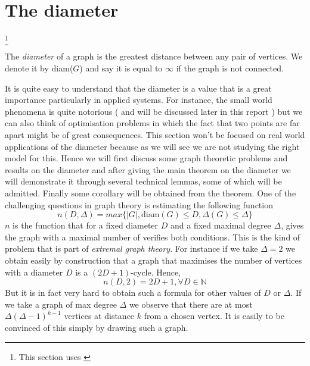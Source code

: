\section{The diameter}\footnote{This section uses \cite{Bollob01}}

\begin{definition}
	The \emph{diameter} of a graph is the greatest distance between any pair of vertices. We denote it by diam($G$) and say it is equal to $\infty$ if the graph is not connected.
\end{definition}
It is quite easy to understand that the diameter is a value that is a great importance particularly in applied systems. For instance, the small world phenomena is quite notorious ( and will be discussed later in this report ) but we can also think of optimisation problems in which the fact that two points are far apart might be of great consequences.
This section won't be focused on real world applications of the diameter because as we will see we are not studying the right model for this. 
Hence we will first discuss some graph theoretic problems and results on the diameter and after giving the main theorem on the diameter we will demonstrate it through several technical lemmas, some of which will be admitted. Finally some corollary will be obtained from the theorem.
\newline
One of the challenging questions in graph theory is estimating the following function
\begin{equation}
	n(D, \Delta) = max\{ |G|, \text{diam}(G) \leq D, \Delta(G) \leq \Delta\}
\end{equation}
$n$ is the function that for a fixed diameter $D$ and a fixed maximal degree $\Delta$, gives the graph with a maximal number of verifies both conditions. This is the kind of problem that is part of \emph{extremal graph theory}.
\newline
For instance if we take $\Delta = 2$ we obtain easily by construction that a graph that maximises the number of vertices with a diameter $D$ is a $(2D+1)$-cycle. Hence, 
\begin{equation}
	n(D, 2) = 2D + 1, \forall D \in \mathbb{N}
\end{equation}
But it is in fact very hard to obtain such a formula for other values of $D$ or $\Delta$.
\newline
If we take a graph of max degree $\Delta$ we observe that there are at most $\Delta (\Delta - 1)^{k-1}$ vertices at distance $k$ from a chosen vertex. It is easily to be convinced of this simply by drawing such a graph. 
